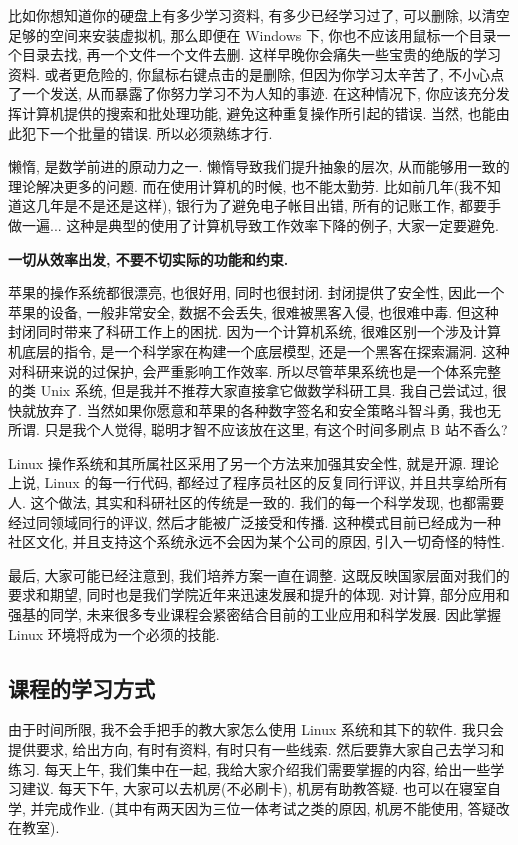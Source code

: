 \documentclass[a4paper]{ctexart}
\begin{document}
比如你想知道你的硬盘上有多少学习资料, 有多少已经学习过了, 可以删除, 以清空足够的空间来安装虚拟机,
那么即便在 Windows 下, 你也不应该用鼠标一个目录一个目录去找, 再一个文件一个文件去删.
这样早晚你会痛失一些宝贵的绝版的学习资料. 或者更危险的, 你鼠标右键点击的是删除, 但因为你学习太辛苦了,
不小心点了一个发送, 从而暴露了你努力学习不为人知的事迹. 在这种情况下, 你应该充分发挥计算机提供的搜索和批处理功能,
避免这种重复操作所引起的错误. 当然, 也能由此犯下一个批量的错误. 所以必须熟练才行.

懒惰, 是数学前进的原动力之一. 懒惰导致我们提升抽象的层次, 从而能够用一致的理论解决更多的问题. 而在使用计算机的时候,
也不能太勤劳. 比如前几年(我不知道这几年是不是还是这样), 银行为了避免电子帐目出错, 所有的记账工作, 都要手做一遍...
这种是典型的使用了计算机导致工作效率下降的例子, 大家一定要避免.

{\bf 一切从效率出发, 不要不切实际的功能和约束.}

苹果的操作系统都很漂亮, 也很好用, 同时也很封闭. 封闭提供了安全性, 因此一个苹果的设备, 一般非常安全, 数据不会丢失,
很难被黑客入侵, 也很难中毒. 但这种封闭同时带来了科研工作上的困扰. 因为一个计算机系统,
很难区别一个涉及计算机底层的指令, 是一个科学家在构建一个底层模型, 还是一个黑客在探索漏洞.
这种对科研来说的过保护, 会严重影响工作效率. 所以尽管苹果系统也是一个体系完整的类 Unix 系统,
但是我并不推荐大家直接拿它做数学科研工具. 我自己尝试过, 很快就放弃了.
当然如果你愿意和苹果的各种数字签名和安全策略斗智斗勇, 我也无所谓. 只是我个人觉得, 聪明才智不应该放在这里,
有这个时间多刷点 B 站不香么?

Linux 操作系统和其所属社区采用了另一个方法来加强其安全性, 就是开源. 理论上说, Linux 的每一行代码,
都经过了程序员社区的反复同行评议, 并且共享给所有人. 这个做法, 其实和科研社区的传统是一致的.
我们的每一个科学发现, 也都需要经过同领域同行的评议, 然后才能被广泛接受和传播. 这种模式目前已经成为一种社区文化,
并且支持这个系统永远不会因为某个公司的原因, 引入一切奇怪的特性.

最后, 大家可能已经注意到, 我们培养方案一直在调整. 这既反映国家层面对我们的要求和期望,
同时也是我们学院近年来迅速发展和提升的体现. 对计算, 部分应用和强基的同学,
未来很多专业课程会紧密结合目前的工业应用和科学发展. 因此掌握 Linux 环境将成为一个必须的技能.

\subsection{课程的学习方式}

由于时间所限, 我不会手把手的教大家怎么使用 Linux 系统和其下的软件. 我只会提供要求, 给出方向,
有时有资料, 有时只有一些线索. 然后要靠大家自己去学习和练习. 每天上午, 我们集中在一起,
我给大家介绍我们需要掌握的内容, 给出一些学习建议. 每天下午, 大家可以去机房(不必刷卡), 机房有助教答疑.
也可以在寝室自学, 并完成作业. (其中有两天因为三位一体考试之类的原因, 机房不能使用, 答疑改在教室).
\end{document}
